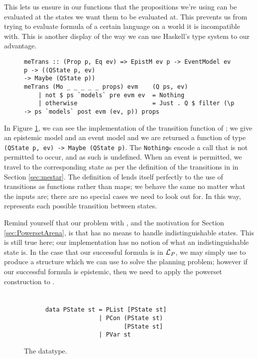 \documentclass[10pt, a4paper]{report}
\begin{document}
This lets us ensure in our functions that the propositions we're using can be
evaluated at the states we want them to be evaluated at. This prevents us from
trying to evaluate formula of a certain language on a world it is incompatible
with. This is another display of the way we can use Haskell's type system to our
advantage. 

\begin{figure}[h]
\begin{verbatim}
meTrans :: (Prop p, Eq ev) => EpistM ev p -> EventModel ev p -> ((QState p, ev)
-> Maybe (QState p))
meTrans (Mo _ _ _ _ _ props) evm    (Q ps, ev)
    | not $ ps `models` pre evm ev  = Nothing
    | otherwise                     = Just . Q $ filter (\p -> ps `models` post evm (ev, p)) props
\end{verbatim}
  \caption{}
  \label{fig:metrans}
\end{figure}

In Figure \ref{fig:metrans}, we can see the implementation of the transition
function of \mestar; we give an epistemic model and an event model and we are
returned a function of type \texttt{(QState p, ev) -> Maybe (QState
  p)}. The \texttt{Nothing}s encode a call that is not permitted to
occur, and as such is undefined. When an event is permitted, we travel to the
corresponding state as per the definition of the transitions in \mestar in
Section \ref{sec:mestar}. The definition of \mestar lends itself perfectly to
the use of transitions as functions rather than maps; we behave the same no
matter what the inputs are; there are no special cases we need to look out for.
In this way, \mestar represents each possible transition between states. 

Remind yourself that our problem with \mestar, and the motivation for Section
\ref{sec:PowersetArena}, is that \mestar has no means to handle
indistinguishable states. This is still true here; our implementation has no
notion of what an indistinguishable state is. In the case that our successful
formula is in $\mathcal{L}_P$, we may simply use \mestar to produce a structure which
we can use to solve the planning problem; however if our successful formula is
epistemic, then we need to apply the powerset construction to \mestar. 

\section{}

\begin{wrapfigure}{l}{0.3\textwidth}
  \centering
    \begin{verbatim}
      data PState st = PList [PState st] 
                     | PCon (PState st) 
                            [PState st] 
                     | PVar st 
    \end{verbatim}
  \caption{The  datatype.}
  \label{fig:PState}
\end{wrapfigure}
\end{document}
